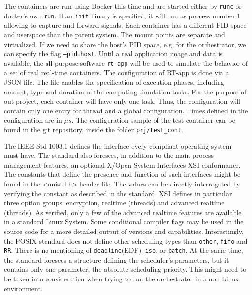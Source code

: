 \documentclass[]{scrartcl}
\begin{document}
The containers are run using Docker this time and are started either by \texttt{runc} or docker's own \texttt{run}. 
If an \texttt{init} binary is specified, it will run as process number 1 allowing to capture and forward signals.
Each container has a different PID space and userspace than the parent system.
The mount points are separate and virtualized.
If we need to share the host's PID space, e.g. for the orchestrator, we can specify the flag \texttt{--pid=host}.
Until a real application image and data is available, the all-purpose software \texttt{rt-app} will be used to simulate the behavior of a set of real real-time containers. 
The configuration of RT-app is done via a JSON file. The file enables the specification of execution phases, including amount, type and duration of the computing simulation tasks.
For the purpose of out project, each container will have only one task. 
Thus, the configuration will contain only one entry for thread and a global configuration.
Times defined in the configuration are in $\mu s$.
The configuration sample of the test container can be found in the git repository, inside the folder \texttt{prj/test\_cont}.

The IEEE Std 1003.1 defines the interface every compliant operating system must have.
The standard also foresees, in addition to the main process management features, an optional X/Open System Interfaces XSI conformance.
The constants that define the presence and function of such interfaces might be found in the <unistd.h> header file. 
The values can be directly interrogated by verifying the constant as described in the standard.
XSI defines in particular three option groups: encryption, realtime (threads) and advanced realtime (threads). 
As verified, only a few of the advanced realtime features are available in a standard Linux System. 
Some conditional compiler flags may be used in the source code for a more detailed output of versions and capabilities. 
Interestingly, the POSIX standard does not define other scheduling types than \texttt{other}, \texttt{fifo} and \texttt{RR}. 
There is no mentioning of \texttt{deadline}(EDF), \texttt{iso}, or \texttt{batch}. 
At the same time, the standard foresees a structure defining the scheduler's parameters, but it contains only one parameter, the absolute scheduling priority.
This might need to be taken into consideration when trying to run the orchestrator in a non Linux environment.

\end{document}
